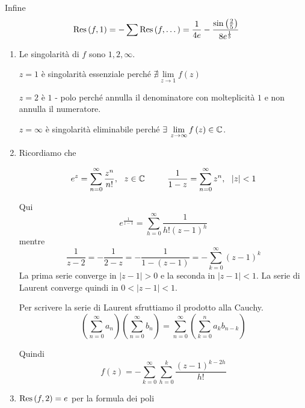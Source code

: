Infine
\begin{equation*}
\operatorname{Res} \left(f,1\right) = - \sum \operatorname{Res} \left(f,\dotsc \right) = \frac{1}{4e} - \frac{\sin\left(\frac{2}{5}\right)}{8e^{\frac{1}{5}}}
\end{equation*}
\Soluzione
\begin{enumerate}
\item Le singolarità di $f$ sono $1,2,\infty $.

$z = 1$ è singolarità essenziale perché $\nexists \lim\limits _{z\rightarrow 1} f\left(z\right)$

$z = 2$ è $1$ - polo perché annulla il denominatore con molteplicità $1$ e non annulla il numeratore.

$z = \infty $ è singolarità eliminabile perché $\exists \lim\limits _{z\rightarrow \infty } f\left(z\right) \in \CC $.
\item Ricordiamo che

\begin{rem}
\begin{equation*}
e^{z} = \sum\limits ^{\infty }_{n = 0}\frac{z^{n}}{n!} ,\ \ z\in \mathbb{C}  \ \ \ \ \ \ \ \ \frac{1}{1 - z} = \sum\limits ^{\infty }_{n = 0} z^{n} ,\ \ \left| z\right| < 1
\end{equation*}
\end{rem}

Qui
\begin{equation*}
e^{\frac{1}{z - 1}} = \sum\limits ^{\infty }_{h = 0}\frac{1}{h!\left(z - 1\right)^{h}}
\end{equation*}mentre
\begin{equation*}
\frac{1}{z - 2} = - \frac{1}{2 - z} = - \frac{1}{1 - \left(z - 1\right)} = - \sum\limits ^{\infty }_{k = 0}\left(z - 1\right)^{k}
\end{equation*}La prima serie converge in $\left| z - 1\right|  > 0$ e la seconda in $\left| z - 1\right| < 1$. La serie di Laurent converge quindi in $0 < \left| z - 1\right| < 1$.
\begin{rem}
Per scrivere la serie di Laurent sfruttiamo il prodotto alla Cauchy.
\begin{equation*}
\left(\sum\limits ^{\infty }_{n = 0} a_{n}\right)\left(\sum\limits ^{\infty }_{n = 0} b_{n}\right) = \sum\limits ^{\infty }_{n = 0}\left(\sum\limits ^{n}_{k = 0} a_{k} b_{n - k}\right)
\end{equation*}
\end{rem}Quindi
\begin{equation*}
f\left(z\right) = - \sum\limits ^{\infty }_{k = 0}\sum\limits ^{k}_{h = 0}\frac{\left(z - 1\right)^{k - 2h}}{h!}
\end{equation*}
\item $\operatorname{Res} \left(f,2\right) = e$ per la formula dei poli


\end{enumerate}
